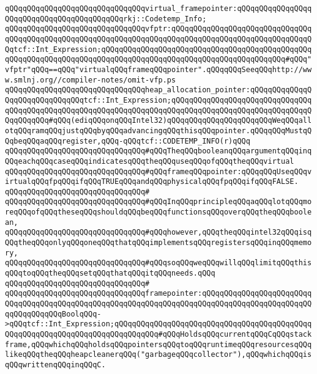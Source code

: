 \verb|qQQqqQQqqQQqqQQqqQQqqQQqqQQqqQQqvirtual_framepointer:qQQqqQQqqQQqqQQqqQQqqQQqqQQqqQQqqQQqqQQqqQQqrkj::Codetemp_Info;|\newline
\verb|qQQqqQQqqQQqqQQqqQQqqQQqqQQqqQQqvfptr:qQQqqQQqqQQqqQQqqQQqqQQqqQQqqQQqqQQqqQQqqQQqqQQqqQQqqQQqqQQqqQQqqQQqqQQqqQQqqQQqqQQqqQQqqQQqqQQqqQQqqQQqtcf::Int_Expression;qQQqqQQqqQQqqQQqqQQqqQQqqQQqqQQqqQQqqQQqqQQqqQQqqQQqqQQqqQQqqQQqqQQqqQQqqQQqqQQqqQQqqQQqqQQqqQQqqQQqqQQqqQQqqQQq#qQQq"vfptr"qQQq==qQQq"virtualqQQqframeqQQqpointer".qQQqqQQqSeeqQQqhttp://www.smlnj.org//compiler-notes/omit-vfp.ps|\newline
\newline
\verb|qQQqqQQqqQQqqQQqqQQqqQQqqQQqqQQqheap_allocation_pointer:qQQqqQQqqQQqqQQqqQQqqQQqqQQqqQQqtcf::Int_Expression;qQQqqQQqqQQqqQQqqQQqqQQqqQQqqQQqqQQqqQQqqQQqqQQqqQQqqQQqqQQqqQQqqQQqqQQqqQQqqQQqqQQqqQQqqQQqqQQqqQQqqQQqqQQqqQQq#qQQq(ediqQQqonqQQqIntel32)qQQqqQQqqQQqqQQqqQQqqQQqWeqQQqallotqQQqramqQQqjustqQQqbyqQQqadvancingqQQqthisqQQqpointer.qQQqqQQqMustqQQqbeqQQqaqQQqregister,qQQq-qQQqtcf::CODETEMP_INFO(r)qQQq|\newline
\newline
\verb|qQQqqQQqqQQqqQQqqQQqqQQqqQQqqQQq#qQQqTheqQQqbooleanqQQqargumentqQQqinqQQqeachqQQqcaseqQQqindicatesqQQqtheqQQquseqQQqofqQQqtheqQQqvirtual|\newline
\verb|qQQqqQQqqQQqqQQqqQQqqQQqqQQqqQQq#qQQqframeqQQqpointer:qQQqqQQqUseqQQqvirtualqQQqfpqQQqifqQQqTRUEqQQqandqQQqphysicalqQQqfpqQQqifqQQqFALSE.|\newline
\verb|qQQqqQQqqQQqqQQqqQQqqQQqqQQqqQQq#|\newline
\verb|qQQqqQQqqQQqqQQqqQQqqQQqqQQqqQQq#qQQqInqQQqprincipleqQQqaqQQqlotqQQqmoreqQQqofqQQqtheseqQQqshouldqQQqbeqQQqfunctionsqQQqoverqQQqtheqQQqboolean,|\newline
\verb|qQQqqQQqqQQqqQQqqQQqqQQqqQQqqQQq#qQQqhowever,qQQqtheqQQqintel32qQQqisqQQqtheqQQqonlyqQQqoneqQQqthatqQQqimplementsqQQqregistersqQQqinqQQqmemory,|\newline
\verb|qQQqqQQqqQQqqQQqqQQqqQQqqQQqqQQq#qQQqsoqQQqweqQQqwillqQQqlimitqQQqthisqQQqtoqQQqtheqQQqsetqQQqthatqQQqitqQQqneeds.qQQq|\newline
\verb|qQQqqQQqqQQqqQQqqQQqqQQqqQQqqQQq#|\newline
\verb|qQQqqQQqqQQqqQQqqQQqqQQqqQQqqQQqframepointer:qQQqqQQqqQQqqQQqqQQqqQQqqQQqqQQqqQQqqQQqqQQqqQQqqQQqqQQqqQQqqQQqqQQqqQQqqQQqqQQqqQQqqQQqqQQqqQQqqQQqqQQqqQQqBoolqQQq->qQQqtcf::Int_Expression;qQQqqQQqqQQqqQQqqQQqqQQqqQQqqQQqqQQqqQQqqQQqqQQqqQQqqQQqqQQqqQQqqQQqqQQqqQQqqQQq#qQQqHoldsqQQqcurrentqQQqCqQQqstackframe,qQQqwhichqQQqholdsqQQqpointersqQQqtoqQQqruntimeqQQqresourcesqQQqlikeqQQqtheqQQqheapcleanerqQQq("garbageqQQqcollector"),qQQqwhichqQQqisqQQqwrittenqQQqinqQQqC.|\newline

